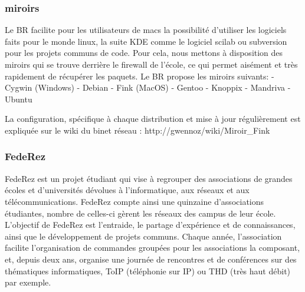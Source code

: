 \subsubsection{miroirs}
Le BR facilite pour les utilisateurs de macs la possibilit\'e d'utiliser les logiciels faits pour le monde linux, la suite KDE comme le logiciel scilab ou subversion pour les projets communs de code. Pour cela, nous mettons \`a disposition des miroirs qui se trouve derri\`ere le firewall de l'\'ecole, ce qui permet ais\'ement et tr\`es rapidement de r\'ecup\'erer les paquets. Le BR propose les miroirs suivants:
	- Cygwin (Windows)
	- Debian
	- Fink (MacOS)
	- Gentoo
	- Knoppix
	- Mandriva
	- Ubuntu
	
La configuration, sp\'ecifique \`a chaque distribution et mise \`a jour r\'eguli\`erement est expliqu\'ee sur le wiki du binet r\'eseau : 
http://gwennoz/wiki/Miroir\_Fink

\subsubsection{FedeRez}
FedeRez est un projet \'etudiant qui vise \`a regrouper des associations de
grandes \'ecoles et d'universit\'es d\'evolues \`a l'informatique, aux r\'eseaux
et aux t\'el\'ecommunications. FedeRez compte ainsi une quinzaine
d'associations \'etudiantes, nombre de celles-ci g\`erent les r\'eseaux des
campus de leur \'ecole. L'objectif de FedeRez est l'entraide, le partage
d'exp\'erience et de connaissances, ainsi que le d\'eveloppement de projets
communs.
Chaque ann\'ee, l'association facilite l'organisation de commandes group\'ees pour les associations la composant, et, depuis deux ans, organise une journ\'ee de rencontres et de conf\'erences sur des th\'ematiques informatiques, ToIP (t\'el\'ephonie sur IP) ou THD (tr\`es haut d\'ebit) par exemple.

